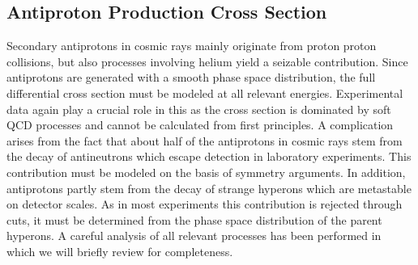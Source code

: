 \documentclass[a4paper,11pt]{article}
\begin{document}
\subsection{Antiproton Production Cross Section}\label{sec:antiprotoncrosssection}

Secondary antiprotons in cosmic rays mainly originate from proton proton collisions, but also processes involving helium yield a seizable contribution. Since antiprotons are generated with a smooth phase space distribution, the full differential cross section must be modeled at all relevant energies. Experimental data again play a crucial role in this as the cross section is dominated by soft QCD processes and cannot be calculated from first principles. A complication arises from the fact that about half of the antiprotons in cosmic rays stem from the decay of antineutrons which escape detection in laboratory experiments. This contribution must be modeled on the basis of symmetry arguments. In addition, antiprotons partly stem from the decay of strange hyperons which are metastable on detector scales. As in most experiments this contribution is rejected through cuts, it must be determined from the phase space distribution of the parent hyperons. A careful analysis of all relevant processes has been performed in~\cite{Kappl:2014hha,Winkler:2017xor} which we will briefly review for completeness. 
\end{document}
